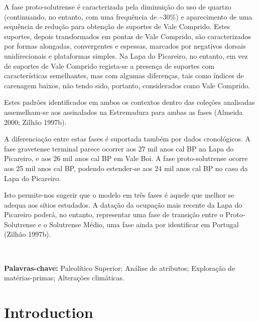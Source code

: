 \documentclass[12pt,twoside]{reedthesis}
\begin{document}
\begin{resumo}
    A fase proto-solutrense é caracterizada pela diminuição do uso de quartzo (continuando, no entanto, com uma frequência de \textasciitilde30\%) e aparecimento de uma sequência de redução para obtenção de suportes de Vale Comprido. Estes suportes, depois transformados em pontas de Vale Comprido, são caracterizados por formas alongadas, convergentes e espessas, marcados por negativos dorsais unidirecionais e plataformas simples. Na Lapa do Picareiro, no entanto, em vez de suportes de Vale Comprido regista-se a presença de suportes com características semelhantes, mas com algumas diferenças, tais como índices de carenagem baixos, não tendo sido, portanto, considerados como Vale Comprido.
    
    Estes padrões identificados em ambos os contextos dentro das coleções analisadas assemelham-se aos assinalados na Estremadura para ambas as fases (Almeida 2000; Zilhão 1997b).
    
    A diferenciação entre estas fases é suportada também por dados cronológicos. A fase gravetense terminal parece ocorrer aos 27 mil anos cal BP na Lapa do Picareiro, e aos 26 mil anos cal BP em Vale Boi. A fase proto-solutrense ocorre aos 25 mil anos cal BP, podendo estender-se aos 24 mil anos cal BP no caso da Lapa do Picareiro.
    
    Isto permite-nos sugerir que o modelo em três fases é aquele que melhor se adequa aos sítios estudados. A datação da ocupação mais recente da Lapa do Picareiro poderá, no entanto, representar uma fase de transição entre o Proto-Solutrense e o Solutrense Médio, uma fase ainda por identificar em Portugal (Zilhão 1997b).
    
    ~
    
    \textbf{Palavras-chave:} Paleolítico Superior; Análise de atributos; Exploração de matérias-primas; Alterações climáticas.
  \end{resumo}
  \hypersetup{linkcolor=black}
  \setcounter{tocdepth}{2}
  \tableofcontents

  \listoftables

  \listoffigures


\mainmatter %
\pagestyle{fancyplain} %

\hypertarget{introduction}{%
\chapter{Introduction}\label{introduction}}
\end{document}
